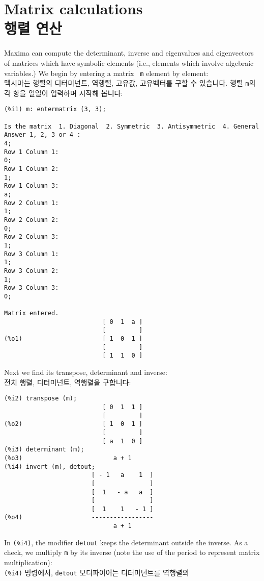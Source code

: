\documentclass[a4paper,12pt]{article}
\begin{document}
\newpage
\section{Matrix calculations \\ 행렬 연산 \label{sec:matrix}}

Maxima can compute the determinant, inverse and eigenvalues and 
eigenvectors of matrices which have symbolic elements (i.e., elements 
which involve algebraic variables.) We begin by entering a matrix {\tt 
 m} element by element: \\
맥시마는 행렬의 디터미넌트, 역행렬, 고유값, 고유벡터를 구할 수 있습니다. 
행렬 {\tt m}의 각 항을 일일이 입력하며 시작해 봅니다:
\begin{verbatim}
(%i1) m: entermatrix (3, 3);

Is the matrix  1. Diagonal  2. Symmetric  3. Antisymmetric  4. General
Answer 1, 2, 3 or 4 : 
4;
Row 1 Column 1: 
0;
Row 1 Column 2: 
1;
Row 1 Column 3: 
a;
Row 2 Column 1: 
1;
Row 2 Column 2: 
0;
Row 2 Column 3: 
1;
Row 3 Column 1: 
1;
Row 3 Column 2: 
1;
Row 3 Column 3: 
0;

Matrix entered.
                           [ 0  1  a ]
                           [         ]
(%o1)                      [ 1  0  1 ]
                           [         ]
                           [ 1  1  0 ]
\end{verbatim}
Next we find its transpose, determinant and inverse: \\
전치 행렬, 디터미넌트, 역행렬을 구합니다:
\begin{verbatim}
(%i2) transpose (m);
                           [ 0  1  1 ]
                           [         ]
(%o2)                      [ 1  0  1 ]
                           [         ]
                           [ a  1  0 ]
(%i3) determinant (m);
(%o3)                         a + 1
(%i4) invert (m), detout;
                        [ - 1   a    1  ]
                        [               ]
                        [  1   - a   a  ]
                        [               ]
                        [  1    1   - 1 ]
(%o4)                   -----------------
                              a + 1
\end{verbatim}
In {\tt (\%i4)}, the modifier {\tt detout} keeps the determinant 
outside the inverse.  As a check, we multiply {\tt m} by its inverse 
(note the use of the period to represent matrix multiplication): \\
{\tt (\%i4)} 명령에서, {\tt detout} 모디파이어는 디터미넌트를 역행렬의 
\end{document}
